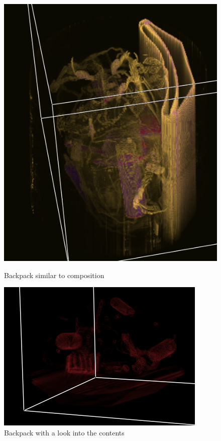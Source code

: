 \documentclass[a4paper,twoside,11pt]{article}
\begin{document}
  \begin{figure}[H]
  \includegraphics[width=\linewidth]{images/backpackOp}
  \caption{Backpack similar to composition}\label{backpackOp}
\endminipage\hfill
{}
  \includegraphics[width=\linewidth]{images/backpackOp2}
  \caption{Backpack with a look into the contents}\label{backpackOp2}
\endminipage\hfill
 \end{figure}
 
\end{document}
